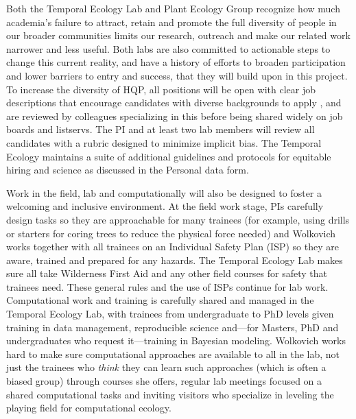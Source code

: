 \documentclass[11pt]{article}
\begin{document}
Both the Temporal Ecology Lab and Plant Ecology Group recognize how much academia's failure to attract, retain and promote the full diversity of people in our broader communities limits our research, outreach and make our related work narrower and less useful. Both labs are also committed to actionable steps to change this current reality, and have a history of efforts to broaden participation and lower barriers to entry and success, that they will build upon in this project. To increase the diversity of HQP, all positions will be open with clear job descriptions that encourage candidates with diverse backgrounds to apply \cite{willis2020,bhalla2019}, and are reviewed by colleagues specializing in this before being shared widely on job boards and listservs.  The PI and at least two lab members will review all candidates with a rubric designed to minimize implicit bias. The Temporal Ecology maintains a suite of additional guidelines and protocols for equitable hiring and science as discussed in the Personal data form. %

Work in the field, lab and computationally will also be designed to foster a welcoming and inclusive environment. At the field work stage, PIs carefully design tasks so they are approachable for many trainees (for example, using drills or starters for coring trees to reduce the physical force needed) and Wolkovich works together with all trainees on an Individual Safety Plan (ISP) so they are aware, trained and prepared for any hazards. The Temporal Ecology Lab makes sure all take Wilderness First Aid and any other field courses for safety that trainees need. These general rules and the use of ISPs continue for lab work. Computational work and training is carefully shared and managed in the Temporal Ecology Lab, with trainees from undergraduate to PhD levels given training in data management, reproducible science and---for Masters, PhD and undergraduates who request it---training in Bayesian modeling. Wolkovich works hard to make sure computational approaches are available to all in the lab, not just the trainees who \emph{think} they can learn such approaches (which is often a biased group) through courses she offers, regular lab meetings focused on a shared computational tasks and inviting visitors who specialize in leveling the playing field for computational ecology. 
\end{document}
